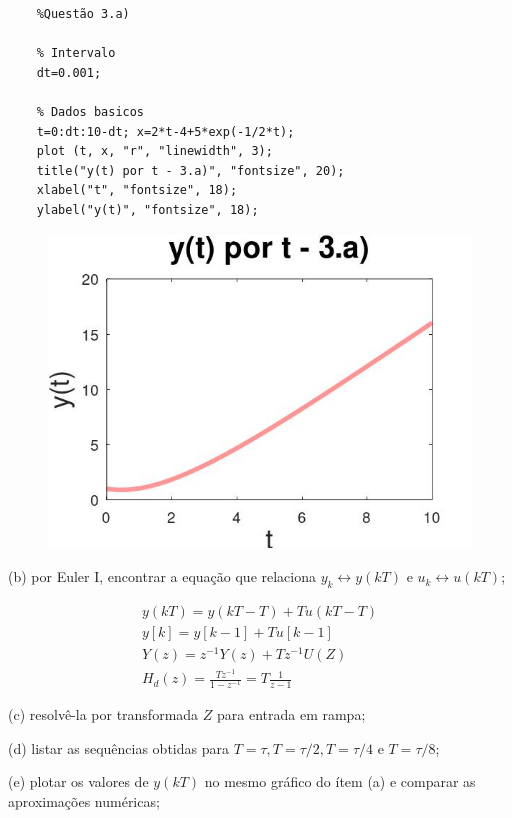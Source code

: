 \documentclass[10pt]{article}
\begin{document}
\begin{verbatim}
    %Questão 3.a)

    % Intervalo
    dt=0.001;

    % Dados basicos
    t=0:dt:10-dt; x=2*t-4+5*exp(-1/2*t);
    plot (t, x, "r", "linewidth", 3);
    title("y(t) por t - 3.a)", "fontsize", 20);
    xlabel("t", "fontsize", 18);
    ylabel("y(t)", "fontsize", 18);
\end{verbatim}

\begin{figure}[h]
    \includegraphics[scale=0.3]{questao3a.jpg}
    \centering
\end{figure}

(b) por Euler I, encontrar a equação que relaciona $y_k \leftrightarrow y(kT)$ e $u_k \leftrightarrow u(kT)$;

\begin{align*}
    y(kT) = y(kT - T) + Tu(kT - T) \\
    y[k] = y[k-1] + Tu[k-1] \\
    Y(z) = z^{-1}Y(z) + Tz^{-1}U(Z) \\
    H_d(z) = \frac{Tz^{-1}}{1 - z^{-1}} = T \frac{1}{z - 1}
\end{align*}

(c) resolvê-la por transformada $Z$ para entrada em rampa;

(d) listar as sequências obtidas para $T = \tau, T = \tau / 2, T = \tau / 4 \text{ e } T = \tau / 8$;

(e) plotar os valores de $y(kT)$ no mesmo gráfico do ítem (a) e comparar as aproximações numéricas;
\end{document}
